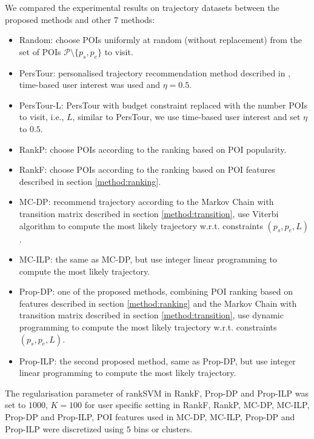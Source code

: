 We compared the experimental results on trajectory datasets between the proposed methods and other 7 methods:
\begin{itemize}
\item Random: choose POIs uniformly at random (without replacement) from the set of POIs $\mathcal{P} \setminus \{p_s, p_e \}$ to visit.
\item PersTour\cite{ijcai15}: personalised trajectory recommendation method described in \cite{ijcai15}, 
      time-based user interest was used and $\eta = 0.5$.
\item PersTour-L: PersTour\cite{ijcai15} with budget constraint replaced with the number POIs to visit, i.e., $L$,
      similar to PersTour, we use time-based user interest and set $\eta$ to $0.5$.
\item RankP: choose POIs according to the ranking based on POI popularity.
\item RankF: choose POIs according to the ranking based on POI features described in section \ref{method:ranking}.
\item MC-DP: recommend trajectory according to the Markov Chain with transition matrix described in section \ref{method:transition},
      use Viterbi algorithm to compute the most likely trajectory w.r.t. constraints $(p_s, p_e, L)$.
\item MC-ILP: the same as MC-DP, but use integer linear programming to compute the most likely trajectory.
\item Prop-DP: one of the proposed methods, combining POI ranking based on features 
      described in section \ref{method:ranking} and the Markov Chain with transition matrix described in section \ref{method:transition},
      use dynamic programming to compute the most likely trajectory w.r.t. constraints $(p_s, p_e, L)$.
\item Prop-ILP: the second proposed method, same as Prop-DP,
      but use integer linear programming to compute the most likely trajectory.
\end{itemize}

The regularisation parameter of rankSVM in RankF, Prop-DP and Prop-ILP was set to $1000$,
$K=100$ for user specific setting in RankF, RankP, MC-DP, MC-ILP, Prop-DP and Prop-ILP,
POI features used in MC-DP, MC-ILP, Prop-DP and Prop-ILP were discretized using $5$ bins or clusters.




